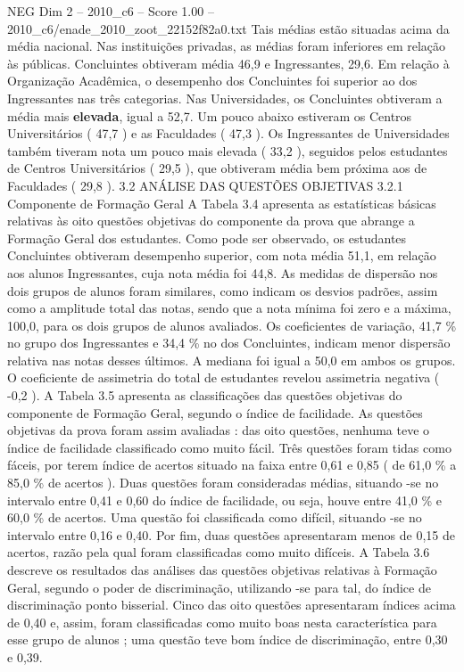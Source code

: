 \begin{textsample}{NEG Dim 2 – 2010\_c6 – Score 1.00 – 2010\_c6/enade\_2010\_zoot\_22152f82a0.txt}
Tais médias estão situadas acima da média nacional.
Nas instituições privadas, as médias foram inferiores em relação às públicas.
Concluintes obtiveram média 46,9 e Ingressantes, 29,6.
Em relação à Organização Acadêmica, o desempenho dos Concluintes foi superior ao dos Ingressantes nas três categorias.
Nas Universidades, os Concluintes obtiveram a média mais \textbf{elevada}, igual a 52,7.
Um pouco abaixo estiveram os Centros Universitários ( 47,7 ) e as Faculdades ( 47,3 ).
Os Ingressantes de Universidades também tiveram nota um pouco mais elevada ( 33,2 ), seguidos pelos estudantes de Centros Universitários ( 29,5 ), que obtiveram média bem próxima aos de Faculdades ( 29,8 ). 3.2 ANÁLISE DAS QUESTÕES OBJETIVAS 3.2.1 Componente de Formação Geral A Tabela 3.4 apresenta as estatísticas básicas relativas às oito questões objetivas do componente da prova que abrange a Formação Geral dos estudantes.
Como pode ser observado, os estudantes Concluintes obtiveram desempenho superior, com nota média 51,1, em relação aos alunos Ingressantes, cuja nota média foi 44,8.
As medidas de dispersão nos dois grupos de alunos foram similares, como indicam os desvios padrões, assim como a amplitude total das notas, sendo que a nota mínima foi zero e a máxima, 100,0, para os dois grupos de alunos avaliados.
Os coeficientes de variação, 41,7 \% no grupo dos Ingressantes e 34,4 \% no dos Concluintes, indicam menor dispersão relativa nas notas desses últimos.
A mediana foi igual a 50,0 em ambos os grupos.
O coeficiente de assimetria do total de estudantes revelou assimetria negativa ( -0,2 ).
A Tabela 3.5 apresenta as classificações das questões objetivas do componente de Formação Geral, segundo o índice de facilidade.
As questões objetivas da prova foram assim avaliadas : das oito questões, nenhuma teve o índice de facilidade classificado como muito fácil.
Três questões foram tidas como fáceis, por terem índice de acertos situado na faixa entre 0,61 e 0,85 ( de 61,0 \% a 85,0 \% de acertos ).
Duas questões foram consideradas médias, situando -se no intervalo entre 0,41 e 0,60 do índice de facilidade, ou seja, houve entre 41,0 \% e 60,0 \% de acertos.
Uma questão foi classificada como difícil, situando -se no intervalo entre 0,16 e 0,40.
Por fim, duas questões apresentaram menos de 0,15 de acertos, razão pela qual foram classificadas como muito difíceis.
A Tabela 3.6 descreve os resultados das análises das questões objetivas relativas à Formação Geral, segundo o poder de discriminação, utilizando -se para tal, do índice de discriminação ponto bisserial.
Cinco das oito questões apresentaram índices acima de 0,40 e, assim, foram classificadas como muito boas nesta característica para esse grupo de alunos ; uma questão teve bom índice de discriminação, entre 0,30 e 0,39.

\end{textsample}

